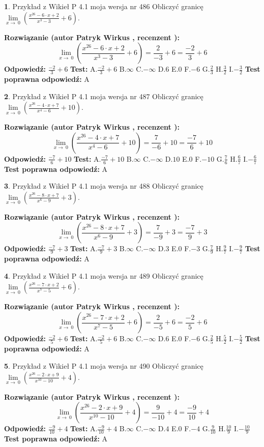 \documentclass[12pt, a4paper]{article}
\theoremstyle{definition} %
\newtheorem{zad}{}
\newcommand{\zadStart}[1]{\begin{zad}#1\newline}
\newcommand{\zadStop}{\end{zad}}
\newcommand{\rozwStart}[2]{\noindent \textbf{Rozwiązanie (autor #1 , recenzent #2): }\newline}
\newcommand{\rozwStop}{\newline}
\newcommand{\odpStart}{\noindent \textbf{Odpowiedź:}\newline}
\newcommand{\odpStop}{\newline}
\newcommand{\testStart}{\noindent \textbf{Test:}\newline}
\newcommand{\testStop}{\newline}
\newcommand{\kluczStart}{\noindent \textbf{Test poprawna odpowiedź:}\newline}
\newcommand{\kluczStop}{\newline}
\begin{document}
\zadStart{Przykład z Wikieł P 4.1 moja wersja nr 486}
Obliczyć granicę $\lim\limits_{x\to\ 0}(\frac{x^{26}-6 \cdot x +2}{x^{3}-3}+6)$.
\zadStop
\rozwStart{Patryk Wirkus}{}
$$\lim\limits_{x\to\ 0}(\frac{x^{26}-6 \cdot x +2}{x^{3}-3}+6)=\frac{2}{-3}+6=\frac{-2}{3}+6$$
\rozwStop
\odpStart
$\frac{-2}{3}+6$
\odpStop
\testStart
A.$\frac{-2}{3}+6$
B.$\infty$
C.$-\infty$
D.$6$
E.$0$
F.$-6$
G.$\frac{2}{3}$
H.$\frac{3}{2}$
I.$-\frac{3}{2}$
\testStop
\kluczStart
A
\kluczStop



\zadStart{Przykład z Wikieł P 4.1 moja wersja nr 487}
Obliczyć granicę $\lim\limits_{x\to\ 0}(\frac{x^{26}-4 \cdot x +7}{x^{4}-6}+10)$.
\zadStop
\rozwStart{Patryk Wirkus}{}
$$\lim\limits_{x\to\ 0}(\frac{x^{26}-4 \cdot x +7}{x^{4}-6}+10)=\frac{7}{-6}+10=\frac{-7}{6}+10$$
\rozwStop
\odpStart
$\frac{-7}{6}+10$
\odpStop
\testStart
A.$\frac{-7}{6}+10$
B.$\infty$
C.$-\infty$
D.$10$
E.$0$
F.$-10$
G.$\frac{7}{6}$
H.$\frac{6}{7}$
I.$-\frac{6}{7}$
\testStop
\kluczStart
A
\kluczStop



\zadStart{Przykład z Wikieł P 4.1 moja wersja nr 488}
Obliczyć granicę $\lim\limits_{x\to\ 0}(\frac{x^{26}-8 \cdot x +7}{x^{6}-9}+3)$.
\zadStop
\rozwStart{Patryk Wirkus}{}
$$\lim\limits_{x\to\ 0}(\frac{x^{26}-8 \cdot x +7}{x^{6}-9}+3)=\frac{7}{-9}+3=\frac{-7}{9}+3$$
\rozwStop
\odpStart
$\frac{-7}{9}+3$
\odpStop
\testStart
A.$\frac{-7}{9}+3$
B.$\infty$
C.$-\infty$
D.$3$
E.$0$
F.$-3$
G.$\frac{7}{9}$
H.$\frac{9}{7}$
I.$-\frac{9}{7}$
\testStop
\kluczStart
A
\kluczStop



\zadStart{Przykład z Wikieł P 4.1 moja wersja nr 489}
Obliczyć granicę $\lim\limits_{x\to\ 0}(\frac{x^{26}-7 \cdot x +2}{x^{7}-5}+6)$.
\zadStop
\rozwStart{Patryk Wirkus}{}
$$\lim\limits_{x\to\ 0}(\frac{x^{26}-7 \cdot x +2}{x^{7}-5}+6)=\frac{2}{-5}+6=\frac{-2}{5}+6$$
\rozwStop
\odpStart
$\frac{-2}{5}+6$
\odpStop
\testStart
A.$\frac{-2}{5}+6$
B.$\infty$
C.$-\infty$
D.$6$
E.$0$
F.$-6$
G.$\frac{2}{5}$
H.$\frac{5}{2}$
I.$-\frac{5}{2}$
\testStop
\kluczStart
A
\kluczStop



\zadStart{Przykład z Wikieł P 4.1 moja wersja nr 490}
Obliczyć granicę $\lim\limits_{x\to\ 0}(\frac{x^{26}-2 \cdot x +9}{x^{10}-10}+4)$.
\zadStop
\rozwStart{Patryk Wirkus}{}
$$\lim\limits_{x\to\ 0}(\frac{x^{26}-2 \cdot x +9}{x^{10}-10}+4)=\frac{9}{-10}+4=\frac{-9}{10}+4$$
\rozwStop
\odpStart
$\frac{-9}{10}+4$
\odpStop
\testStart
A.$\frac{-9}{10}+4$
B.$\infty$
C.$-\infty$
D.$4$
E.$0$
F.$-4$
G.$\frac{9}{10}$
H.$\frac{10}{9}$
I.$-\frac{10}{9}$
\testStop
\kluczStart
A
\kluczStop
\end{document}
